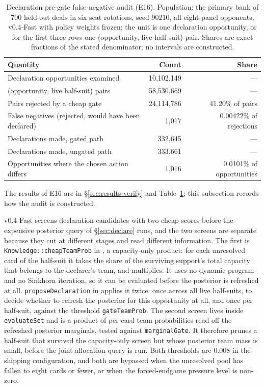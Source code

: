 \documentclass[11pt]{article}
\theoremstyle{definition}
\DeclareRobustCommand{\vfast}{\texorpdfstring{\mbox{v0.4-Fast}}{v0.4-Fast}}
\newcommand{\numHtHDeals}{700}
\begin{document}
\begin{table}[!htbp]
\centering
\caption{Declaration pre-gate false-negative audit (E16). Population: the primary
bank of \numHtHDeals{} held-out deals in six seat rotations, seed $90210$, all
eight panel opponents, \vfast{} with policy weights frozen; the unit is one
declaration opportunity, or for the first three rows one (opportunity, live
half-suit) pair. Shares are exact fractions of the stated denominator; no
intervals are constructed.}
\label{tab:gateaudit}
\small
\begin{tabular}{lrr}
\toprule
Quantity & Count & Share \\
\midrule
Declaration opportunities examined & 10{,}102{,}149 & --- \\
(opportunity, live half-suit) pairs & 58{,}530{,}669 & --- \\
Pairs rejected by a cheap gate & 24{,}114{,}786 & 41.20\% of pairs \\
\midrule
False negatives (rejected, would have been declared) & 1{,}017 & 0.00422\% of rejections \\
Declarations made, gated path & 332{,}645 & --- \\
Declarations made, ungated path & 333{,}661 & --- \\
Opportunities where the chosen action differs & 1{,}016 & 0.0101\% of opportunities \\
\bottomrule
\end{tabular}%
\end{table}


The results of E16 are in \S\ref{sec:results-verify} and
Table~\ref{tab:gateaudit}; this subsection records how the audit is constructed.

\vfast{} screens declaration candidates with two cheap scores before the
expensive posterior query of \S\ref{sec:declare} runs, and the two screens are
separate because they cut at different stages and read different information.
The first is \texttt{Knowledge::cheapTeamProb} in
, a capacity-only product: for each unresolved
card of the half-suit it takes the share of the surviving support's total
capacity that belongs to the declarer's team, and multiplies. It uses no dynamic
program and no Sinkhorn iteration, so it can be evaluated before the posterior
is refreshed at all. \texttt{proposeDeclaration} in
 applies it twice: once across all live half-suits,
to decide whether to refresh the posterior for this opportunity at all, and once
per half-suit, against the threshold \texttt{gateTeamProb}. The second screen
lives inside \texttt{evaluateSet} and is a product of per-card team
probabilities read off the refreshed posterior marginals, tested against
\texttt{marginalGate}. It therefore prunes a half-suit that survived the
capacity-only screen but whose posterior team mass is small, before the joint
allocation query is run. Both thresholds are $0.008$ in the shipping
configuration, and both are bypassed when the unresolved pool has fallen to
eight cards or fewer, or when the forced-endgame pressure level is non-zero.
\end{document}
